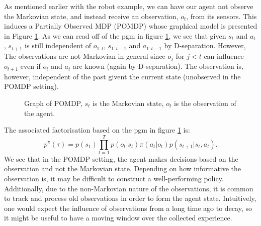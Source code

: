 \documentclass{report}
\numberwithin{equation}{section}
\numberwithin{figure}{section}
\numberwithin{table}{section}
\begin{document}
As mentioned earlier with the robot example, we can have our agent 
not observe the Markovian state, and instead receive an observation, 
$o_t$, from its sensors. This induces a Partially Observed MDP (POMDP) 
whose graphical model is presented in Figure \ref{fig:POMDP}. As we 
can read off of the pgm in figure \ref{fig:POMDP}, we see that given 
$s_t$ and $a_t$, $s_{t+1}$ is still independent of 
$o_{1:t}$, $s_{1:t-1}$ and $a_{1:t-1}$ by D-separation. However,
The observations are not Markovian in general since $o_j$ for $j<t$ 
can influence $o_{t+1}$ even if $o_t$ and $a_t$ are known (again by 
D-separation). The observation is, however, independent of the past
givent the current state (unobserved in the POMDP setting).

\begin{figure}[H]
  \centering
  \caption{\label{fig:POMDP} Graph of POMDP, $s_t$ is the Markovian 
  state, $o_t$ is the observation of the agent.}
\end{figure}

The associated factorisation based on the pgm in 
figure \ref{fig:POMDP} is:
\begin{equation}
  p^{\pi}(\tau)=p(s_1)\prod_{t=1}^T p(o_t|s_t)\pi(a_t|o_t)p(s_{t+1}|s_t, a_t).
\end{equation}
We see that in the POMDP setting, the agent makes decisions based 
on the observation and not the Markovian state. Depending on how 
informative the observation is, it may be difficult to construct 
a well-performing policy. Additionally, due to the non-Markovian 
nature of the observations, it is common to track and process old 
observations in order to form the agent state. Intuitively, one 
would expect the influence of observations from a long time ago 
to decay, so it might be useful to have a moving window over the 
collected experience.
\end{document}
